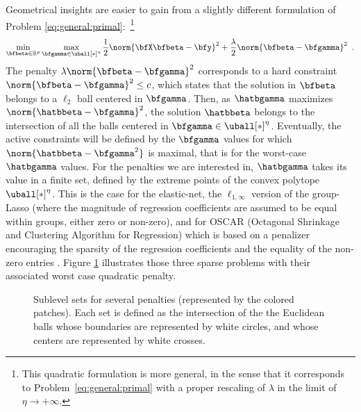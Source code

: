 Geometrical insights are easier to gain from a slightly different formulation of
Problem \eqref{eq:general:primal}:~\footnote{%
  This quadratic formulation is more general, in the sense that it corresponds to
  Problem~\eqref{eq:general:primal} with a proper rescaling of $\lambda$ in the
  limit of $\eta\rightarrow+\infty$.
}
%
\begin{equation}\label{eq:general:dual}
  \min_{\bfbeta\in\mathbb{R}^p} \max_{\bfgamma\in\uball[*]^\eta}
    \frac{1}{2} \norm{\bfX \bfbeta - \bfy}^2 + \frac{\lambda}{2} \norm{\bfbeta - \bfgamma}^2
  \enspace.
\end{equation}
The penalty $\lambda\norm{\bfbeta - \bfgamma}^2$ corresponds to a hard
constraint $\norm{\bfbeta - \bfgamma}^2\leq c$, which states that the 
solution in $\bfbeta$ belongs to a $\ell_{2}$ ball centered in $\bfgamma$.
Then, as $\hatbgamma$ maximizes $\norm{\hatbbeta - \bfgamma}^2$, the
solution $\hatbbeta$ belongs to the intersection of all the balls
centered in $\bfgamma\in\uball[*]^\eta$.
Eventually, the active constraints will be defined by the $\bfgamma$ values for
which $\norm{\hatbbeta - {\bfgamma}^2}$ is maximal, that is for the
worst-case $\hatbgamma$ values. 
For the penalties we are interested in, $\hatbgamma$ takes its value in a
finite set, defined by the extreme points of the convex polytope $\uball[*]^\eta$.
% 
% 
This is the case for the elastic-net,
the $\ell_{1,\infty}$ version of the group-Lasso 
(where the magnitude of regression coefficients are assumed to be equal within
groups, either zero or non-zero), 
and for OSCAR (Octagonal Shrinkage and Clustering Algorithm for Regression)
which is based on a penalizer encouraging the sparsity of the regression
coefficients and the equality of the non-zero entries \citep{Bondell08}.
%
Figure \ref{fig:penalties} illustrates  those three  sparse problems
with their  associated worst case quadratic penalty.


% 
\begin{figure}
  \begin{center} 
    \caption{Sublevel sets for several penalties (represented by the 
             colored patches).  
             Each set is defined as the intersection of the the Euclidean balls 
             whose boundaries are represented by white circles, and whose centers are
             represented by white crosses.}
     \label{fig:penalties}
    \end{center} 
\end{figure}


